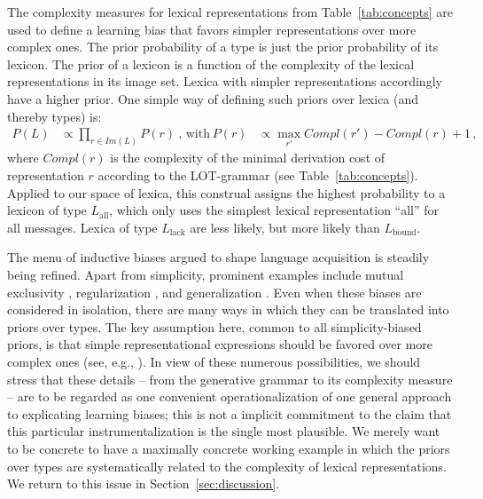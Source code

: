 \documentclass[a4paper, 11pt]{article}
\theoremstyle{Satz}
\newcommand{\mylang}[1]{\ensuremath{L_{\text{#1}}}\xspace} %
\newcommand{\Lall}{\mylang{all}}
\newcommand{\Lbound}{\mylang{bound}}
\newcommand{\Llack}{\mylang{lack}}
\begin{document}
The complexity measures for lexical representations from Table~\ref{tab:concepts} are used to
define a learning bias that favors simpler representations over more complex ones. The prior
probability of a type is just the prior probability of its lexicon. The prior of a lexicon is a
function of the complexity of the lexical representations in its image set. Lexica with simpler
representations accordingly have a higher prior. One simple way of defining such priors over
lexica (and thereby types) is:
\begin{align*}
  P(L)  & \propto \prod_{r \in Im(L)} P(r)   \ \text{, with} & 
  P(r) & \propto \max_{r'}Compl(r') - Compl(r) + 1\,,
\end{align*}
where $Compl(r)$ is the complexity of the minimal derivation cost of representation $r$ according to the
LOT-grammar (see Table~\ref{tab:concepts}). Applied to our space of lexica, this construal assigns the highest probability 
to a lexicon of type $\Lall$, which only uses the simplest lexical representation ``all'' for
all messages. Lexica of type $\Llack$ are less likely, but more likely than $\Lbound$. 

The menu of inductive biases argued to shape language acquisition is steadily being
refined. Apart from simplicity, prominent examples include mutual exclusivity
\citep{merriman+bowman:1989,clark:2009}, regularization \citep{hudson+etal:2005}, and
generalization \citep{smith:2011}. Even when these biases are considered in isolation, there
are many ways in which they can be translated into priors over types. The key assumption here,
common to all simplicity-biased priors, is that simple representational expressions should be
favored over more complex ones (see, e.g., \citealt{goodman+etal:2008, piantadosi+etal:2012a,
  kirby+etal:2015}). In view of these numerous possibilities, we should stress that these
details -- from the generative grammar to its complexity measure -- are to be regarded as one
convenient operationalization of one general approach to explicating learning biases; this is
not a implicit commitment to the claim that this particular instrumentalization is the single
most plausible. We merely want to be concrete to have a maximally concrete working example in
which the priors over types are systematically related to the complexity of lexical
representations. We return to this issue in Section~\ref{sec:discussion}.
\end{document}
